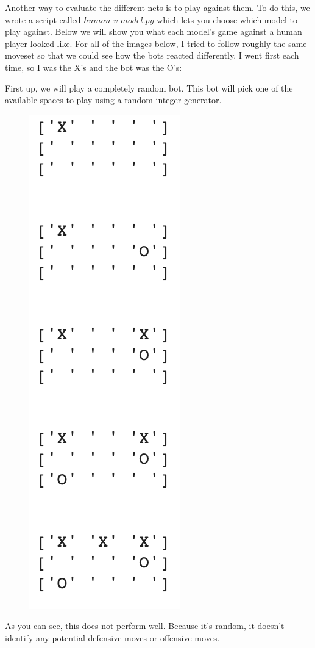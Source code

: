 
	
	


Another way to evaluate the different nets is to play against them. To do this, we wrote a script called $human\_v\_model.py$ which lets you choose which model to play against. Below we will show you what each model's game against a human player looked like. For all of the images below, I tried to follow roughly the same moveset so that we could see how the bots reacted differently. I went first each time, so I was the X's and the bot was the O's:

First up, we will play a completely random bot. This bot will pick one of the available spaces to play using a random integer generator. 
\begin{figure}[H]
	\centering
	\includegraphics[scale=.5]{h_v_random}
\end{figure}
As you can see, this does not perform well. Because it's random, it doesn't identify any potential defensive moves or offensive moves.

